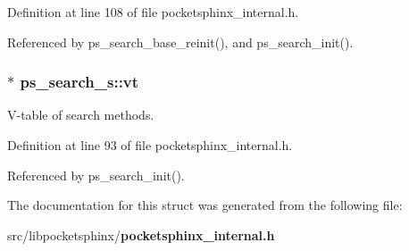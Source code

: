 Definition at line 108 of file pocketsphinx\-\_\-internal.\-h.



Referenced by ps\-\_\-search\-\_\-base\-\_\-reinit(), and ps\-\_\-search\-\_\-init().

\subsubsection[{vt}]{$\ast$ ps\-\_\-search\-\_\-s\-::vt}\label{structps__search__s_aa51e88956bbe9c05359d32526180809b}


V-\/table of search methods. 



Definition at line 93 of file pocketsphinx\-\_\-internal.\-h.



Referenced by ps\-\_\-search\-\_\-init().



The documentation for this struct was generated from the following file\-:\begin{DoxyCompactItemize}
\item 
src/libpocketsphinx/{\bf pocketsphinx\-\_\-internal.\-h}\end{DoxyCompactItemize}
